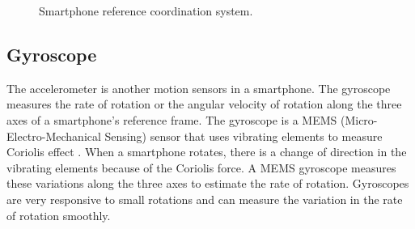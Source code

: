 \begin{figure}[!ht]
\centering
{}
\hfill
{}

\caption{Smartphone reference coordination system.}
\label{f:coord_dia}
\end{figure}

\subsection{Gyroscope}
The accelerometer is another motion sensors in a smartphone.
The gyroscope measures the rate of rotation or the angular velocity of rotation along the three axes of a smartphone's reference frame.
The gyroscope is a MEMS (Micro-Electro-Mechanical Sensing) sensor that uses vibrating elements to measure Coriolis effect .
When a smartphone rotates, there is a change of direction in the vibrating elements because of the Coriolis force.
A MEMS gyroscope measures these variations along the three axes to estimate the rate of rotation.
Gyroscopes are very responsive to small rotations and can measure the variation in the rate of rotation smoothly.

